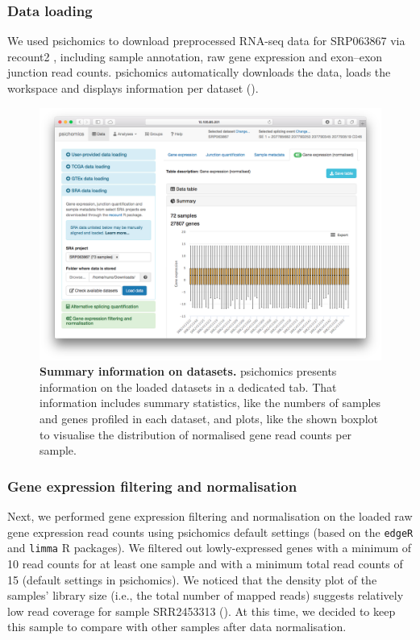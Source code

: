\subsubsection{Data loading}

We used psichomics to download preprocessed RNA-seq data for SRP063867 via recount2 \cite{collado-torres:2017uw}, including sample annotation, raw gene expression and exon–exon junction read counts. psichomics automatically downloads the data, loads the workspace and displays information per dataset ().

\begin{figure}[!ht]
  \includegraphics[width=\textwidth]{images/psichomics/0-gene-expr-summary}
  \centering
  \caption[Summary information on datasets]{\textbf{Summary information on datasets.} psichomics presents information on the loaded datasets in a dedicated tab. That information includes summary statistics, like the numbers of samples and genes profiled in each dataset, and plots, like the shown boxplot to visualise the distribution of normalised gene read counts per sample.}
  \label{fig:psichomics-gene-expr-summary}
\end{figure}

\subsubsection{Gene expression filtering and normalisation}

Next, we performed gene expression filtering and normalisation on the loaded raw gene expression read counts using psichomics default settings (based on the \texttt{edgeR} \cite{robinson:2010wx} and \texttt{limma} \cite{ritchie:2015tm} R packages). We filtered out lowly-expressed genes with a minimum of 10 read counts for at least one sample and with a minimum total read counts of 15 (default settings in psichomics). We noticed that the density plot of the samples’ library size (i.e., the total number of mapped reads) suggests relatively low read coverage for sample SRR2453313 (). At this time, we decided to keep this sample to compare with other samples after data normalisation.

